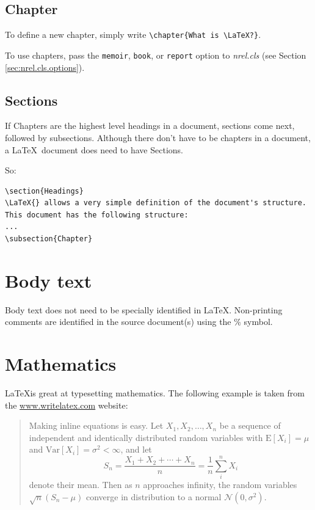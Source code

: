 \documentclass[12pt,letterpaper]{report}
\begin{document}
\subsection{Chapter}
To define a new chapter, simply write \verb+\chapter{What is \LaTeX?}+.

To use chapters, pass the \texttt{memoir}, \texttt{book}, or \texttt{report} option to \emph{nrel.cls} (see Section \ref{sec:nrel.cls.options}).

\subsection{Sections}
If Chapters are the highest level headings in a document, sections come next, followed by subsections. Although there don't have to be chapters in a document, a \LaTeX\ document does need to have Sections.

So: 

\begin{verbatim}
\section{Headings}
\LaTeX{} allows a very simple definition of the document's structure. 
This document has the following structure:
...
\subsection{Chapter}

\end{verbatim}

\section{Body text}
Body text does not need to be specially identified in \LaTeX{}. Non-printing comments are identified in the source document(s) using the \% symbol.

\section{Mathematics}

\LaTeX is great at typesetting mathematics. The following example is taken from the \url{www.writelatex.com} website:

\begin{quote}
Making inline equations is easy. Let $X_1, X_2, \ldots, X_n$ be a sequence of independent and identically distributed random variables with $\textrm{E}[X_i] = \mu$ and $\textrm{Var}[X_i] = \sigma^2 < \infty$, and let
$$S_n = \frac{X_1 + X_2 + \cdots + X_n}{n}
 = \frac{1}{n}\sum_{i}^{n} X_i$$
denote their mean. Then as $n$ approaches infinity, the random variables $\sqrt{n}(S_n - \mu)$ converge in distribution to a normal $\mathcal{N}(0, \sigma^2)$.
\end{quote}
\end{document}
